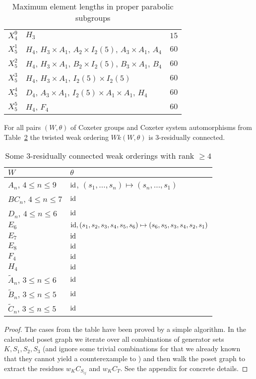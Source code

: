 \begin{table}[ht]
\begin{tabular}{l|p{7cm}|l}
		$X_4^9$ & $H_3$ & $15$ \\
		$X_5^1$ & $H_4$, $H_3 \times A_1$, $A_2 \times I_2(5)$, $A_3 \times A_1$, $A_4$ & $60$ \\
		$X_5^2$ & $H_4$, $H_3 \times A_1$, $B_2 \times I_2(5)$, $B_3 \times A_1$, $B_4$ & $60$ \\
		$X_5^3$ & $H_4$, $H_3 \times A_1$, $I_2(5) \times I_2(5)$ & $60$ \\
		$X_5^4$ & $D_4$, $A_3 \times A_1$, $I_2(5) \times A_1 \times A_1$, $H_4$ & $60$ \\
		$X_5^5$ & $H_4$, $F_4$ & $60$ \\
	\end{tabular}
	\caption{Maximum element lengths in proper parabolic subgroups}
	\label{tab:parabolic-max-length}	
\end{table}

\begin{theo}
	For all pairs $(W,\theta)$ of Coxeter groups and Coxeter system automorphisms from Table~\ref{tab:rc3-wks} the twisted weak ordering $Wk(W,\theta)$ is 3-residually connected.

	\begin{table}[ht]
		\centering
		\begin{tabular}{ll}
			$W$ & $\theta$ \\
			\hline
			$A_n$, $4 \leq n \leq 9$ & $\operatorname{id}$, $(s_1, \ldots, s_n) \mapsto (s_n, \ldots, s_1)$ \\
			$BC_{n}$, $4 \leq n \leq 7$ & $\operatorname{id}$ \\
			$D_{n}$, $4 \leq n \leq 6$ & $\operatorname{id}$ \\
			$E_6$ & $\operatorname{id}, (s_1,s_2,s_3,s_4,s_5,s_6) \mapsto (s_6,s_5,s_3,s_4,s_2,s_1)$ \\
			$E_7$ & $\operatorname{id}$ \\
			$E_8$ & $\operatorname{id}$ \\
			$F_4$ & $\operatorname{id}$ \\
			$H_4$ & $\operatorname{id}$ \\
			$\tilde A_{n}$, $3 \leq n \leq 6$ & $\operatorname{id}$ \\
			$\tilde B_{n}$, $3 \leq n \leq 5$ & $\operatorname{id}$ \\
			$\tilde C_{n}$, $3 \leq n \leq 5$ & $\operatorname{id}$ \\
		\end{tabular}
		\caption{Some 3-residually connected weak orderings with rank $\geq 4$}
		\label{tab:rc3-wks}	
	\end{table}

	\begin{proof}
		The cases from the table have been proved by a simple algorithm. In the calculated poset graph we iterate over all combinations of generator sets $K,S_1,S_2,S_3$ (and ignore some trivial combinations for that we already known that they cannot yield a counterexample to ) and then walk the poset graph to extract the residues $w_K C_{S_{ij}}$ and $w_K C_T$. See the appendix for concrete details.
	\end{proof}
\end{theo}
